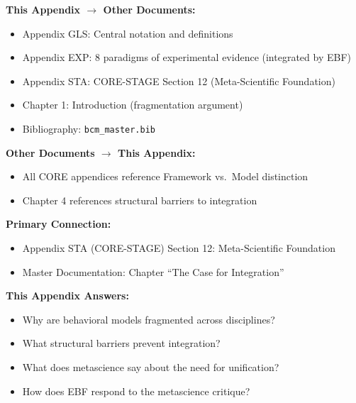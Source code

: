 \begin{tcolorbox}[colback=gray!5!white, colframe=gray!75!black,
    title=\textbf{Cross-Reference Map}]

\textbf{This Appendix $\rightarrow$ Other Documents:}
\begin{itemize}[nosep]
    \item Appendix GLS: Central notation and definitions
    \item Appendix EXP: 8 paradigms of experimental evidence (integrated by EBF)
    \item Appendix STA: CORE-STAGE Section 12 (Meta-Scientific Foundation)
    \item Chapter 1: Introduction (fragmentation argument)
    \item Bibliography: \texttt{bcm\_master.bib}
\end{itemize}

\textbf{Other Documents $\rightarrow$ This Appendix:}
\begin{itemize}[nosep]
    \item All CORE appendices reference Framework vs.\ Model distinction
    \item Chapter 4 references structural barriers to integration
\end{itemize}

\end{tcolorbox}

\begin{tcolorbox}[colback=purple!5!white, colframe=purple!75!black,
    title=Chapter Linkage]

\textbf{Primary Connection:}
\begin{itemize}[nosep]
\item Appendix STA (CORE-STAGE) Section 12: Meta-Scientific Foundation
\item Master Documentation: Chapter ``The Case for Integration''
\end{itemize}

\textbf{This Appendix Answers:}
\begin{itemize}[nosep]
\item Why are behavioral models fragmented across disciplines?
\item What structural barriers prevent integration?
\item What does metascience say about the need for unification?
\item How does EBF respond to the metascience critique?
\end{itemize}

\end{tcolorbox}

